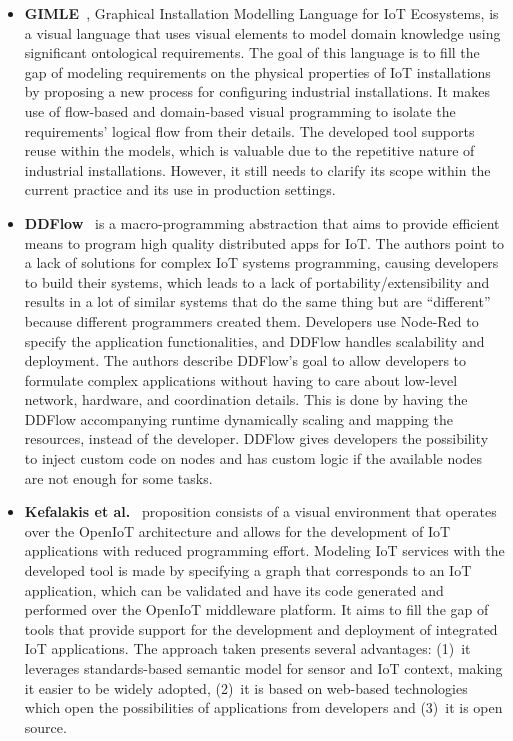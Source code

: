 \begin{itemize}
\item\textbf{GIMLE}~\cite{gimle}, Graphical Installation Modelling Language for IoT Ecosystems, is a visual language that uses visual elements to model domain knowledge using significant ontological requirements. The goal of this language is to fill the gap of modeling requirements on the physical properties of IoT installations by proposing a new process for configuring industrial installations. It makes use of flow-based and domain-based visual programming to isolate the requirements' logical flow from their details. The developed tool supports reuse within the models, which is valuable due to the repetitive nature of industrial installations. However, it still needs to clarify its scope within the current practice and its use in production settings.

\item\textbf{DDFlow}~\cite{ddflow} is a macro-programming abstraction that aims to provide efficient means to program high quality distributed apps for IoT. The authors point to a lack of solutions for complex IoT systems programming, causing developers to build their systems, which leads to a lack of portability/extensibility and results in a lot of similar systems that do the same thing but are  ``different'' because different programmers created them. Developers use Node-Red to specify the application functionalities, and DDFlow handles scalability and deployment. The authors describe DDFlow's goal to allow developers to formulate complex applications without having to care about low-level network, hardware, and coordination details. This is done by having the DDFlow accompanying runtime dynamically scaling and mapping the resources, instead of the developer. DDFlow gives developers the possibility to inject custom code on nodes and has custom logic if the available nodes are not enough for some tasks.

\item\textbf{Kefalakis et al.}~\cite{visual_paradigm_iot_solutions_development} proposition consists of a visual environment that operates over the OpenIoT architecture and allows for the development of IoT applications with reduced programming effort. Modeling IoT services with the developed tool is made by specifying a graph that corresponds to an IoT application, which can be validated and have its code generated and performed over the OpenIoT middleware platform. It aims to fill the gap of tools that provide support for the development and deployment of integrated IoT applications. The approach taken presents several advantages: (1)~it leverages standards-based semantic model for sensor and IoT context, making it easier to be widely adopted, (2)~it is based on web-based technologies which open the possibilities of applications from developers and (3)~it is open source. 


\end{itemize}
